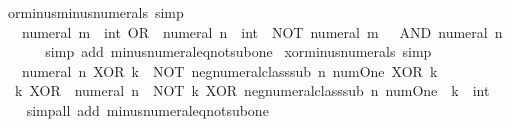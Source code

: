 \begin{isabellebody}
\isanewline
{}\isamarkupfalse%
\ or{\isacharunderscore}{\kern0pt}minus{\isacharunderscore}{\kern0pt}minus{\isacharunderscore}{\kern0pt}numerals\ {\isacharbrackleft}{\kern0pt}simp{\isacharbrackright}{\kern0pt}{\isacharcolon}{\kern0pt}\isanewline
\ \ {\isacartoucheopen}{\isacharminus}{\kern0pt}\ {\isacharparenleft}{\kern0pt}numeral\ m\ {\isacharcolon}{\kern0pt}{\isacharcolon}{\kern0pt}\ int{\isacharparenright}{\kern0pt}\ OR\ {\isacharminus}{\kern0pt}\ {\isacharparenleft}{\kern0pt}numeral\ n\ {\isacharcolon}{\kern0pt}{\isacharcolon}{\kern0pt}\ int{\isacharparenright}{\kern0pt}\ {\isacharequal}{\kern0pt}\ NOT\ {\isacharparenleft}{\kern0pt}{\isacharparenleft}{\kern0pt}numeral\ m\ {\isacharminus}{\kern0pt}\ {}{\isacharparenright}{\kern0pt}\ AND\ {\isacharparenleft}{\kern0pt}numeral\ n\ {\isacharminus}{\kern0pt}\ {}{\isacharparenright}{\kern0pt}{\isacharparenright}{\kern0pt}{\isacartoucheclose}\isanewline
%
\isadelimproof
\ \ %
\endisadelimproof
%
\isatagproof
{}\isamarkupfalse%
\ {\isacharparenleft}{\kern0pt}simp\ add{\isacharcolon}{\kern0pt}\ minus{\isacharunderscore}{\kern0pt}numeral{\isacharunderscore}{\kern0pt}eq{\isacharunderscore}{\kern0pt}not{\isacharunderscore}{\kern0pt}sub{\isacharunderscore}{\kern0pt}one{\isacharparenright}{\kern0pt}%
\endisatagproof
{\isafoldproof}%
%
\isadelimproof
\isanewline
%
\endisadelimproof
\isanewline
{}\isamarkupfalse%
\ xor{\isacharunderscore}{\kern0pt}minus{\isacharunderscore}{\kern0pt}numerals\ {\isacharbrackleft}{\kern0pt}simp{\isacharbrackright}{\kern0pt}{\isacharcolon}{\kern0pt}\isanewline
\ \ {\isacartoucheopen}{\isacharminus}{\kern0pt}\ numeral\ n\ XOR\ k\ {\isacharequal}{\kern0pt}\ NOT\ {\isacharparenleft}{\kern0pt}neg{\isacharunderscore}{\kern0pt}numeral{\isacharunderscore}{\kern0pt}class{\isachardot}{\kern0pt}sub\ n\ num{\isachardot}{\kern0pt}One\ XOR\ k{\isacharparenright}{\kern0pt}{\isacartoucheclose}\isanewline
\ \ {\isacartoucheopen}k\ XOR\ {\isacharminus}{\kern0pt}\ numeral\ n\ {\isacharequal}{\kern0pt}\ NOT\ {\isacharparenleft}{\kern0pt}k\ XOR\ {\isacharparenleft}{\kern0pt}neg{\isacharunderscore}{\kern0pt}numeral{\isacharunderscore}{\kern0pt}class{\isachardot}{\kern0pt}sub\ n\ num{\isachardot}{\kern0pt}One{\isacharparenright}{\kern0pt}{\isacharparenright}{\kern0pt}{\isacartoucheclose}\ \ k\ {\isacharcolon}{\kern0pt}{\isacharcolon}{\kern0pt}\ int\isanewline
%
\isadelimproof
\ \ %
\endisadelimproof
%
\isatagproof
{}\isamarkupfalse%
\ {\isacharparenleft}{\kern0pt}simp{\isacharunderscore}{\kern0pt}all\ add{\isacharcolon}{\kern0pt}\ minus{\isacharunderscore}{\kern0pt}numeral{\isacharunderscore}{\kern0pt}eq{\isacharunderscore}{\kern0pt}not{\isacharunderscore}{\kern0pt}sub{\isacharunderscore}{\kern0pt}one{\isacharparenright}{\kern0pt}%

\end{isabellebody}
